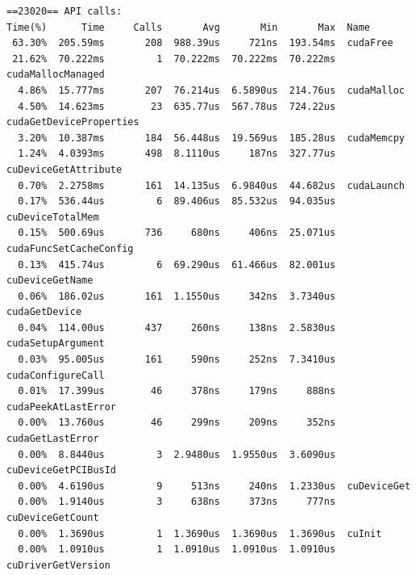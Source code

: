 \documentclass[a4paper]{article}
\begin{document}
\begin{lstlisting}
==23020== API calls:
Time(%)      Time     Calls       Avg       Min       Max  Name
 63.30%  205.59ms       208  988.39us     721ns  193.54ms  cudaFree
 21.62%  70.222ms         1  70.222ms  70.222ms  70.222ms  cudaMallocManaged
  4.86%  15.777ms       207  76.214us  6.5890us  214.76us  cudaMalloc
  4.50%  14.623ms        23  635.77us  567.78us  724.22us  cudaGetDeviceProperties
  3.20%  10.387ms       184  56.448us  19.569us  185.28us  cudaMemcpy
  1.24%  4.0393ms       498  8.1110us     187ns  327.77us  cuDeviceGetAttribute
  0.70%  2.2758ms       161  14.135us  6.9840us  44.682us  cudaLaunch
  0.17%  536.44us         6  89.406us  85.532us  94.035us  cuDeviceTotalMem
  0.15%  500.69us       736     680ns     406ns  25.071us  cudaFuncSetCacheConfig
  0.13%  415.74us         6  69.290us  61.466us  82.001us  cuDeviceGetName
  0.06%  186.02us       161  1.1550us     342ns  3.7340us  cudaGetDevice
  0.04%  114.00us       437     260ns     138ns  2.5830us  cudaSetupArgument
  0.03%  95.005us       161     590ns     252ns  7.3410us  cudaConfigureCall
  0.01%  17.399us        46     378ns     179ns     888ns  cudaPeekAtLastError
  0.00%  13.760us        46     299ns     209ns     352ns  cudaGetLastError
  0.00%  8.8440us         3  2.9480us  1.9550us  3.6090us  cuDeviceGetPCIBusId
  0.00%  4.6190us         9     513ns     240ns  1.2330us  cuDeviceGet
  0.00%  1.9140us         3     638ns     373ns     777ns  cuDeviceGetCount
  0.00%  1.3690us         1  1.3690us  1.3690us  1.3690us  cuInit
  0.00%  1.0910us         1  1.0910us  1.0910us  1.0910us  cuDriverGetVersion
\end{lstlisting}
\end{document}
